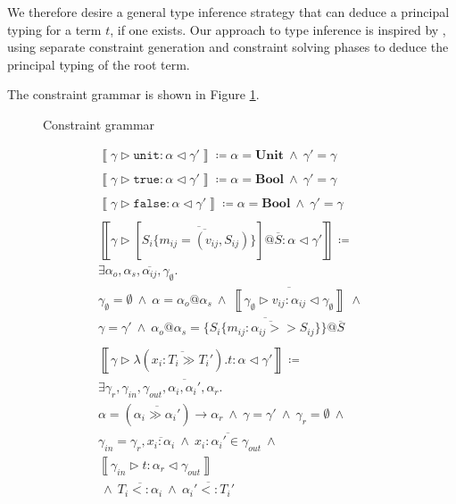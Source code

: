 \documentclass[preprint]{sigplanconf}
\newcommand{\figref}[1]{Figure \ref{#1}}
\newcommand{\inferrule}[4]{\left\llbracket #1 \triangleright #2 : #3 \triangleleft #4 \right\rrbracket}
\newcommand{\inferlhs}[1]{\left\llbracket \gamma \triangleright #1 : \alpha \triangleleft \gamma' \right\rrbracket}
\newcommand{\unitv}{\mathtt{unit}}
\newcommand{\unitt}{\mathbf{Unit}}
\newcommand{\truev}{\mathtt{true}}
\newcommand{\falsev}{\mathtt{false}}
\newcommand{\boolt}{\mathbf{Bool}}
\newcommand{\cand}{\:\wedge\:}
\begin{document}
We therefore desire a general type inference strategy that can 
deduce a principal typing for a term $t$, if one exists. Our approach to type 
inference is inspired by \cite{Pottier2005}, using separate
constraint generation and constraint solving phases 
to deduce the principal typing of the root term.

The constraint grammar is shown in \figref{fig:congrammar}.

\begin{figure}
\ottgrammartabular{
\ottC\ottinterrule
\ottctxc\ottinterrule
\otttyc\ottinterrule
\otttinf\ottinterrule
\ottoinf\ottinterrule
\ottsinf\ottinterrule
}
\caption{\label{fig:congrammar} Constraint grammar}
\end{figure}

\begin{figure}
\[
\begin{array}{ll}

\inferlhs{\unitv} \coloneqq \alpha = \unitt \cand \gamma' = \gamma
\\\\

\inferlhs{\truev} \coloneqq \alpha = \boolt \cand \gamma' = \gamma 
\\\\

\inferlhs{\falsev} \coloneqq \alpha = \boolt \cand \gamma' = \gamma 
\\\\

\inferlhs{[ \overline{S_i \{ \overline{ m_{ij} = (v_{ij}, S_{ij}) } \} }]@\overline{S}}
\coloneqq \\
\exists \alpha_o, \alpha_s, \overline{\alpha_{ij}}, \gamma_{\emptyset} . \\
\gamma_{\emptyset} = \emptyset
\cand
\alpha = \alpha_o@\alpha_s
\cand
\overline{\inferrule{\gamma_{\emptyset}}{v_{ij}}{\alpha_{ij}}{\gamma_{\emptyset}}}
\cand
\\
\gamma = \gamma'
\cand
\alpha_o @ \alpha_s = \{ \overline{ S_i \{ \overline{ m_{ij} : \alpha_{ij} >> S_{ij} } \} }\} @ \overline{S}
\\\\

\inferlhs{\lambda ( \overline{x_i : T_i \gg T_i'} ) . t} \coloneqq \\
\exists \gamma_r, \gamma_{in}, \gamma_{out}, \overline{\alpha_i, \alpha_i'}, \alpha_r . \\
\alpha = (\overline{\alpha_i \gg \alpha_i'}) \rightarrow \alpha_r
\cand
\gamma = \gamma'
\cand
\gamma_r = \emptyset
\cand \\
\gamma_{in} = \gamma_r, \overline{x_i : \alpha_i}
\cand
\overline{x_i : \alpha_i' \in \gamma_{out}}
\cand
\\
\inferrule{\gamma_{in}}{t}{\alpha_r}{\gamma_{out}}
\\
\cand
\overline{T_i <: \alpha_i}
\cand
\overline{\alpha_i' <: T_i'}
\\\\


\end{array}\]
\end{figure}
\end{document}
